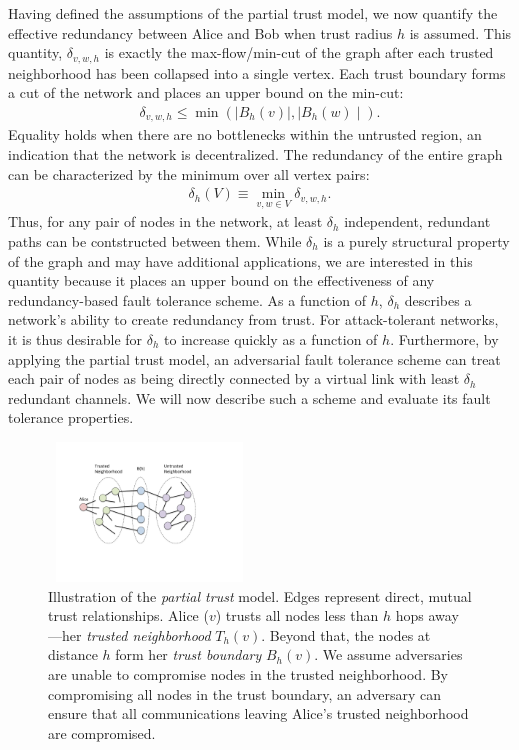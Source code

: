 \documentclass{sig-alternate-05-2015}
\newcommand{\beq}{\begin{eqnarray}}
\newcommand{\eeq}{\end{eqnarray}}
\begin{document}
Having defined the assumptions of the partial trust model,
we now quantify the effective redundancy between Alice and Bob
when trust radius $h$ is assumed.
This quantity, $\delta_{v,w,h}$ is exactly the max-flow/min-cut of
the graph after each trusted neighborhood has been
collapsed into a single vertex.
Each trust boundary forms a cut of the network and places an upper bound on the
min-cut:
\beq
\delta_{v,w,h} \leq \min\left( \mid B_h(v) \mid, \mid B_h(w) \mid \right).
\eeq
Equality holds when there are no bottlenecks within the untrusted region,
an indication that the network is decentralized.
The redundancy of the entire graph can be characterized by the minimum over
all vertex pairs:
\beq
\delta_h(V) \equiv \min_{v,w \in V} \delta_{v,w,h}.
\eeq
Thus, for any pair of nodes in the network, at least $\delta_h$ independent,
redundant paths can be contstructed between them.
While $\delta_h$ is a purely structural property of the graph and
may have additional applications,
we are interested in this quantity because
it places an upper bound on the effectiveness of any
redundancy-based fault tolerance scheme.
As a function of $h$, $\delta_h$ describes a network's ability to create
redundancy from trust.
For attack-tolerant networks,
it is thus desirable for $\delta_h$ to increase quickly as a function of $h$.
Furthermore, by applying the partial trust model,
an adversarial fault tolerance scheme can treat each pair of nodes as being
directly connected by a virtual link with least $\delta_h$ redundant
channels.
We will now describe such a scheme and evaluate its fault tolerance properties.

\begin{figure}
\centerline{\includegraphics[width=2.12in,height=1.46in]{fig-alice_trusted_neigh2}}
\caption{
Illustration of the {\em partial trust} model.
Edges represent direct, mutual trust relationships.
Alice ($v$) trusts all nodes less than
$h$ hops away---her {\em trusted neighborhood} $T_h(v)$.
Beyond that, the nodes at distance $h$ form her {\em trust boundary} $B_h(v)$.
We assume adversaries are unable to compromise nodes in the trusted neighborhood.
By compromising all nodes in the trust boundary, an adversary can ensure that
all communications leaving Alice's trusted neighborhood are compromised.
}
\label{fig:trust-source}
\end{figure}
\end{document}

